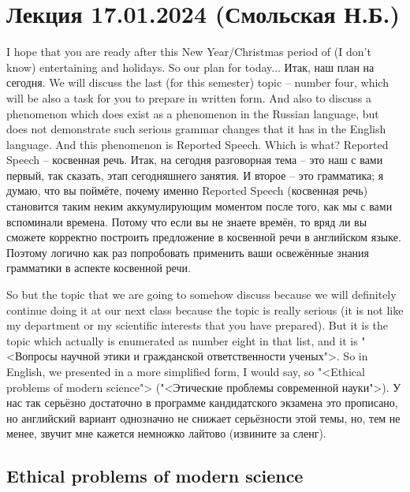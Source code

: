 \documentclass[main.tex]{subfiles}
\begin{document}
\section{Лекция 17.01.2024 (Смольская Н.Б.)}

I hope that you are ready after this New Year/Christmas period of (I don't know) entertaining and holidays.
So our plan for today...
Итак, наш план на сегодня.
We will discuss the last (for this semester) topic -- number four, which will be also a task for you to prepare in written form.
And also to discuss a phenomenon which does exist as a phenomenon in the Russian language, but does not demonstrate such serious grammar changes that it has in the English language.
And this phenomenon is Reported Speech.
Which is what?
Reported Speech -- косвенная речь.
Итак, на сегодня разговорная тема -- это наш с вами первый, так сказать, этап сегодняшнего занятия.
И второе -- это грамматика; я думаю, что вы поймёте, почему именно Reported Speech (косвенная речь) становится таким неким аккумулирующим моментом после того, как мы с вами вспоминали времена.
Потому что если вы не знаете времён, то вряд ли вы сможете корректно построить предложение в косвенной речи в английском языке.
Поэтому логично как раз попробовать применить ваши освежённые знания грамматики в аспекте косвенной речи.

So but the topic that we are going to somehow discuss because we will definitely continue doing it at our next class because the topic is really serious (it is not like my department or my scientific interests that you have prepared).
But it is the topic which actually is enumerated as number eight in that list, and it is "<Вопросы научной этики и гражданской ответственности ученых">.
So in English, we presented in a more simplified form, I would say, so "<Ethical problems of modern science"> ("<Этические проблемы современной науки">).
У нас так серьёзно достаточно в программе кандидатского экзамена это прописано, но английский вариант однозначно не снижает серьёзности этой темы, но, тем не менее, звучит мне кажется немножко лайтово (извините за сленг).

\subsection{Ethical problems of modern science}
\end{document}
